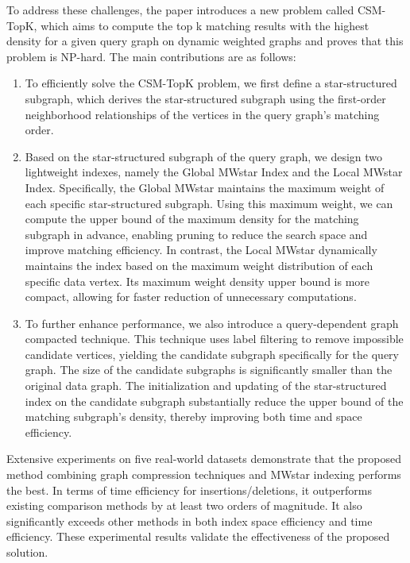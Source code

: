 \begin{enabstract}
	
	To address these challenges, the paper introduces a new problem called CSM-TopK, which aims to compute the top k matching results with the highest density for a given query graph on dynamic weighted graphs and proves that this problem is NP-hard. 
	The main contributions are as follows:
	\begin{enumerate}[label=(\arabic*)]  
		\item To efficiently solve the CSM-TopK problem, we first define a star-structured subgraph, which derives the star-structured subgraph using the first-order neighborhood relationships of the vertices in the query graph’s matching order.
		\item Based on the star-structured subgraph of the query graph, we design two lightweight indexes, namely the Global MWstar Index and the Local MWstar Index. 
		Specifically, the Global MWstar maintains the maximum weight of each specific star-structured subgraph. 
		Using this maximum weight, we can compute the upper bound of the maximum density for the matching subgraph in advance, enabling pruning to reduce the search space and improve matching efficiency. 
		In contrast, the Local MWstar dynamically maintains the index based on the maximum weight distribution of each specific data vertex. 
		Its maximum weight density upper bound is more compact, allowing for faster reduction of unnecessary computations.
		\item To further enhance performance, we also introduce a query-dependent graph compacted technique. 
		This technique uses label filtering to remove impossible candidate vertices, yielding the candidate subgraph specifically for the query graph. 
		The size of the candidate subgraphs is significantly smaller than the original data graph. 
		The initialization and updating of the star-structured index on the candidate subgraph substantially reduce the upper bound of the matching subgraph’s density, thereby improving both time and space efficiency.
		\end{enumerate}

		Extensive experiments on five real-world datasets demonstrate that the proposed method combining graph compression techniques and MWstar indexing performs the best. 
		In terms of time efficiency for insertions/deletions, it outperforms existing comparison methods by at least two orders of magnitude. 
		It also significantly exceeds other methods in both index space efficiency and time efficiency. 
		These experimental results validate the effectiveness of the proposed solution.
\end{enabstract}
